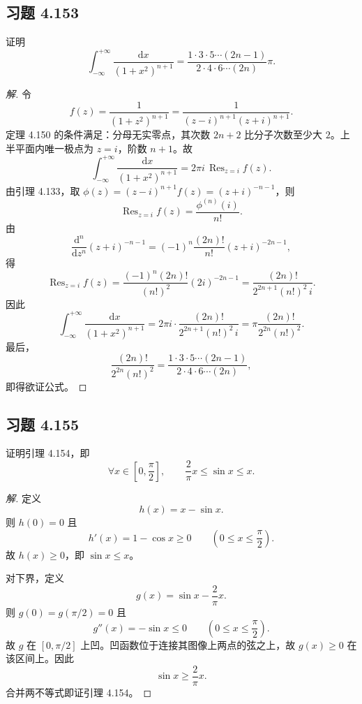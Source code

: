 \documentclass[11pt,a4paper]{article}
\newcommand{\dd}{\mathrm{d}}
\newcommand{\Res}{\operatorname{Res}}
\theoremstyle{definition}
\newenvironment{solution}{\begin{proof}[解]}{\end{proof}}
\begin{document}
\subsection{习题 4.153}

证明
\[
  \int_{-\infty}^{+\infty}\frac{\dd x}{(1+x^2)^{n+1}}
  =
  \frac{1\cdot 3\cdot 5\cdots(2n-1)}
       {2\cdot 4\cdot 6\cdots(2n)}\pi .
\]

\begin{solution}
  令
  \[
    f(z)=\frac{1}{(1+z^2)^{n+1}}
    =\frac{1}{(z-i)^{n+1}(z+i)^{n+1}}.
  \]
  定理 4.150 的条件满足：分母无实零点，其次数 $2n+2$ 比分子次数至少大 $2$。上半平面内唯一极点为 $z=i$，阶数 $n+1$。故
  \[
    \int_{-\infty}^{+\infty}\frac{\dd x}{(1+x^2)^{n+1}}
    =2\pi i\,\Res_{z=i} f(z).
  \]
  由引理 4.133，取 $\phi(z)=(z-i)^{n+1}f(z)=(z+i)^{-n-1}$，则
  \[
    \Res_{z=i} f(z)
    =\frac{\phi^{(n)}(i)}{n!}.
  \]
  由
  \[
    \frac{\dd^n}{\dd z^n}(z+i)^{-n-1}
    =(-1)^n\frac{(2n)!}{n!}(z+i)^{-2n-1},
  \]
  得
  \[
    \Res_{z=i} f(z)
    =
    \frac{(-1)^n(2n)!}{(n!)^2}(2i)^{-2n-1}
    =
    \frac{(2n)!}{2^{2n+1}(n!)^2\,i}.
  \]
  因此
  \[
    \int_{-\infty}^{+\infty}\frac{\dd x}{(1+x^2)^{n+1}}
    =
    2\pi i\cdot
    \frac{(2n)!}{2^{2n+1}(n!)^2\,i}
    =
    \pi\frac{(2n)!}{2^{2n}(n!)^2}.
  \]
  最后，
  \[
    \frac{(2n)!}{2^{2n}(n!)^2}
    =
    \frac{1\cdot 3\cdot 5\cdots(2n-1)}
         {2\cdot 4\cdot 6\cdots(2n)},
  \]
  即得欲证公式。
\end{solution}

\subsection{习题 4.155}

证明引理 4.154，即
\[
  \forall x\in\left[0,\frac{\pi}{2}\right],
  \qquad
  \frac{2}{\pi}x\le \sin x\le x.
\]

\begin{solution}
  定义
  \[
    h(x)=x-\sin x.
  \]
  则 $h(0)=0$ 且
  \[
    h'(x)=1-\cos x\ge 0
    \qquad
    \left(0\le x\le \frac{\pi}{2}\right).
  \]
  故 $h(x)\ge 0$，即 $\sin x\le x$。

  对下界，定义
  \[
    g(x)=\sin x-\frac{2}{\pi}x.
  \]
  则 $g(0)=g(\pi/2)=0$ 且
  \[
    g''(x)=-\sin x\le 0
    \qquad
    \left(0\le x\le \frac{\pi}{2}\right).
  \]
  故 $g$ 在 $[0,\pi/2]$ 上凹。凹函数位于连接其图像上两点的弦之上，故 $g(x)\ge 0$ 在该区间上。因此
  \[
    \sin x\ge \frac{2}{\pi}x.
  \]
  合并两不等式即证引理 4.154。
\end{solution}
\end{document}
